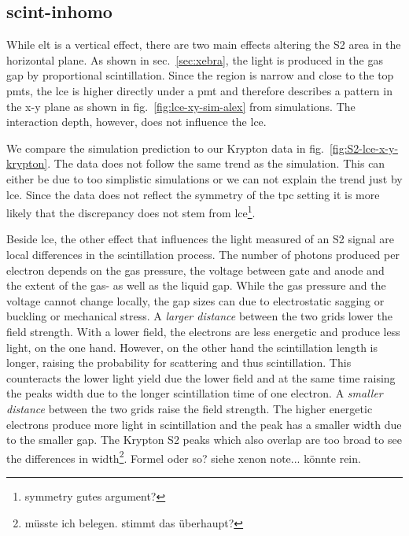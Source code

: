 
\FloatBarrier
\subsection{scint-inhomo}
\label{ssec:scint-inhomo}
\FloatBarrier


While \gls{elt} is a vertical effect, there are two main effects altering the S2 area in the horizontal plane.
As shown in sec.~\ref{sec:xebra}, the light is produced in the gas gap by proportional scintillation.
Since the region is narrow and close to the top \gls{pmt}s, the \gls{lce} is higher directly under a \gls{pmt} and therefore describes a pattern in the x-y plane as shown in fig.~\ref{fig:lce-xy-sim-alex} from simulations.
The interaction depth, however, does not influence the \gls{lce}.

We compare the simulation prediction to our Krypton data in fig.~\ref{fig:S2-lce-x-y-krypton}.  %
The data does not follow the same trend as the simulation.
This can either be due to too simplistic simulations or we can not explain the trend just by \gls{lce}.
Since the data does not reflect the symmetry of the \gls{tpc} setting it is more likely that the discrepancy does not stem from \gls{lce}\footnote{symmetry gutes argument?}.

Beside \gls{lce}, the other effect that influences the light measured of an S2 signal are local differences in the scintillation process.
The number of photons produced per electron depends on the gas pressure, the voltage between gate and anode and the extent of the gas- as well as the liquid gap.
While the gas pressure and the voltage cannot change locally, the gap sizes can due to electrostatic sagging or buckling or mechanical stress.
A \emph{larger distance} between the two grids lower the field strength.
With a lower field, the electrons are less energetic and produce less light, on the one hand.
However, on the other hand the scintillation length is longer, raising the probability for scattering and thus scintillation.
This counteracts the lower light yield due the lower field and at the same time raising the peaks width due to the longer scintillation time of one electron.
A \emph{smaller distance} between the two grids raise the field strength.
The higher energetic electrons produce more light in scintillation and the peak has a smaller width due to the smaller gap.
The Krypton S2 peaks which also overlap are too broad to see the differences in width\footnote{müsste ich belegen. stimmt das überhaupt?}.
Formel oder so? siehe xenon note... könnte rein.

